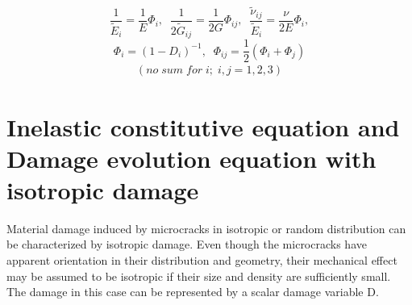 \begin{equation}
\frac{1}{\tilde{E}_{i}} = \frac{1}{E}\Phi_{i}, \;\; \frac{1}{2\tilde{G}_{ij}}  = \frac{1}{2G}\Phi_{ij},\;\; \frac{\tilde{\nu}_{ij}}{\tilde{E}_{i}} =  \frac{\nu}{2E}\Phi_{i},
\end{equation} 
\begin{equation}
\Phi_{i}  =   (1  - D_{i})^{-1}, \;\; \Phi_{ij} =  \frac{1}{2}(\Phi_{i}  +  \Phi_{j}) 
\end{equation}
\begin{align*}
(no \; sum \; for \; i; \; i,j = 1,2,3)
\end{align*}
\section{Inelastic constitutive equation and Damage evolution equation with isotropic damage}
\indent\indent\indent  Material damage induced by microcracks in isotropic or random distribution can be characterized by isotropic damage. Even though the microcracks have apparent orientation in their distribution and geometry, their mechanical effect may be assumed to be isotropic if their size and density are sufficiently small. The damage in this case can be represented by a scalar damage variable D.
